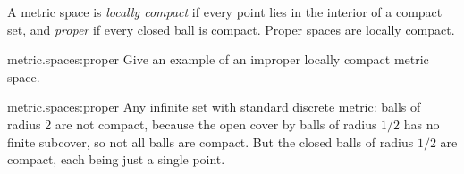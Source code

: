 A metric space is \emph{locally compact} if every point lies in the interior of a compact set, and \emph{proper} if every closed ball is compact.
Proper spaces are locally compact.
\begin{problem}{metric.spaces:proper}
Give an example of an improper locally compact metric space.
\end{problem}
\begin{answer}{metric.spaces:proper}
Any infinite set with standard discrete metric: balls of radius 2 are not compact, because the open cover by balls of radius \(1/2\) has no finite subcover, so not all balls are compact.
But the closed balls of radius \(1/2\) are compact, each being just a single point.
\end{answer}
